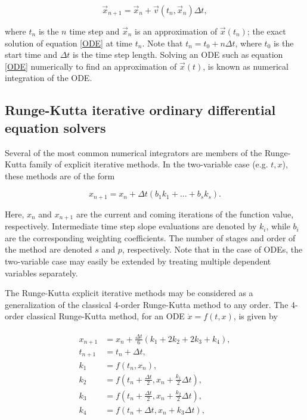 \begin{equation}\label{eq:Euler}
	\vec{x}_{n+1} = \vec{x}_n + \vec{v}(t_n,\vec{x}_n)\Delta t,
\end{equation}

\noindent where $t_n$ is the $n$ time step and $\vec{x}_n$ is an approximation of $\vec{x}(t_n)$; the exact solution of equation \eqref{ODE} at time $t_n$. Note that $t_n = t_0 + n\Delta t$, where $t_0$ is the start time and $\Delta t$ is the time step length. Solving an ODE such as equation \eqref{ODE} numerically to find an approximation of $\vec{x}(t)$, is known as numerical integration of the ODE.

\subsection{Runge-Kutta iterative ordinary differential equation solvers}\label{sec:RK}

Several of the most common numerical integrators are members of the Runge-Kutta family of explicit iterative methods. In the two-variable case (e.g. $t,x$), these methods are of the form

\begin{equation} \label{eq:RK}
	x_{n+1} = x_n + \Delta t(b_1k_1+...+b_s k_s).
\end{equation}

\noindent Here, $x_n$ and $x_{n+1}$ are the current and coming iterations of the function value, respectively. Intermediate time step slope evaluations are denoted by $k_i$, while $b_i$ are the corresponding weighting coefficients. The number of stages and order of the method are denoted $s$ and $p$, respectively. Note that in the case of ODEs, the two-variable case may easily be extended by treating multiple dependent variables separately.

The Runge-Kutta explicit iterative methods may be considered as a generalization of the classical 4-order Runge-Kutta method to any order. The 4-order classical Runge-Kutta method, for an ODE $\dot{x}=f(t,x)$, is given by

\begin{align} \label{eq:RK4a}
\begin{aligned}
	x_{n+1} &= x_n + \frac{\Delta t}{6}(k_1 +2k_2 + 2k_3 + k_4), \\
	t_{n+1} &= t_n + \Delta t, \\
	k_1 &= f(t_n,x_n), \\
	k_2 &= f(t_n + \frac{\Delta t}{2}, x_n + \frac{k_1}{2} \Delta t), \\
	k_3 &= f(t_n + \frac{\Delta t}{2}, x_n + \frac{k_2}{2} \Delta t), \\
	k_4 &= f(t_n + \Delta t,x_n + k_3 \Delta t),
\end{aligned}
\end{align} 

